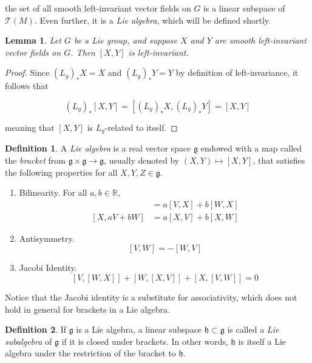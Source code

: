 \documentclass{article}
\newtheorem{lemma}[theorem]{Lemma}
\theoremstyle{remark}
\theoremstyle{definition}
\newtheorem{definition}{Definition}[section]
\begin{document}
    the set of all smooth left-invariant vector fields on $G$ is a linear subspace of $\mathcal{T}(M)$. Even further, it is a \textit{Lie algebra}, which will be defined shortly.  

    \begin{lemma}
      Let $G$ be a Lie group, and suppose $X$ and $Y$ are smooth left-invariant vector fields on $G$. Then $[X, Y]$ is left-invariant. 
    \end{lemma}
    \begin{proof}
      Since $(L_g)_* X = X$ and $(L_g)_* Y = Y$ by definition of left-invariance, it follows that

        \[(L_g)_* [X,Y] = [(L_g)_* X, (L_g)_* Y] = [X,Y]\]

      meaning that $[X, Y]$ is $L_g$-related to itself. 
    \end{proof}

    \begin{definition}
      A \textit{Lie algebra} is a real vector space $\mathfrak{g}$ endowed with a map called the \textit{bracket} from $\mathfrak{g} \times \mathfrak{g} \longrightarrow \mathfrak{g}$, usually denoted by $(X, Y) \mapsto [X, Y]$, that satisfies the following properties for all $X, Y, Z \in \mathfrak{g}$. 

      \begin{enumerate}
        \item Bilinearity. For all $a, b \in \mathbb{R}$, 
        \begin{align*}
          [a V + b W, X] & = a [V, X] + b [W, X] \\
          [X, a V + b W] & = a [X, V] + b [X, W]
        \end{align*}

        \item Antisymmetry.
        \[[V, W] = - [W, V]\]

        \item Jacobi Identity. 
        \[[V,[W,X]] + [W,[X,V]] + [X,[V,W]] = 0\]
      \end{enumerate}

      Notice that the Jacobi identity is a substitute for associativity, which does not hold in general for brackets in a Lie algebra. 
    \end{definition}

    \begin{definition}
      If $\mathfrak{g}$ is a Lie algebra, a linear subspace $\mathfrak{h} \subset \mathfrak{g}$ is called a \textit{Lie subalgebra} of $\mathfrak{g}$ if it is closed under brackets. In other words, $\mathfrak{h}$ is itself a Lie algebra under the restriction of the bracket to $\mathfrak{h}$. 
    \end{definition}
\end{document}
